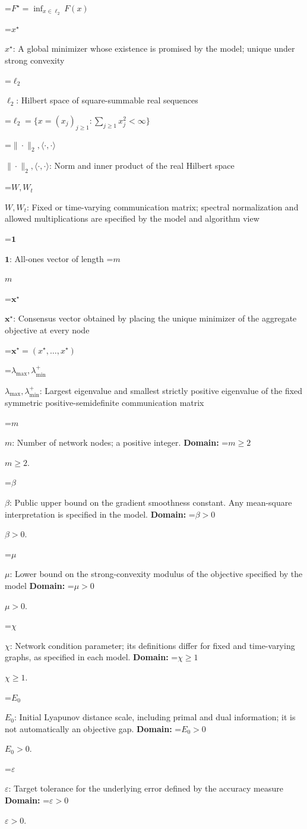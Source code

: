 \documentclass[10pt,a4paper]{article}
\newcommand{\AtlasMath}[1]{\par\begingroup\centering\setbox0=\hbox{$\displaystyle #1$}\ifdim\wd0>1.4\linewidth\typeout{ATLAS WIDE FORMULA: \the\wd0}\fi\ifdim\wd0>\linewidth\resizebox{\linewidth}{!}{\box0}\else\box0\fi\par\endgroup}
\newcommand{\AtlasInlineMath}[1]{\begingroup\setbox0=\hbox{$#1$}\ifdim\wd0>.4\linewidth\endgroup\AtlasMath{#1}\else\endgroup$#1$\fi}
\begin{document}
\AtlasMath{F^\star=\inf_{x\in \ell_2}F(x)}


\AtlasInlineMath{x^\star}: A global minimizer whose existence is promised by the model; unique under strong convexity

\AtlasInlineMath{\ell_2}: Hilbert space of square-summable real sequences


\AtlasMath{\ell_2=\{x=(x_j)_{j\ge1}:\sum_{j\ge1}x_j^2<\infty\}}


\AtlasInlineMath{\|\cdot\|_2,\langle\cdot,\cdot\rangle}: Norm and inner product of the real Hilbert space

\AtlasInlineMath{W,W_t}: Fixed or time-varying communication matrix; spectral normalization and allowed multiplications are specified by the model and algorithm view

\AtlasInlineMath{\mathbf1}: All-ones vector of length \AtlasInlineMath{m}

\AtlasInlineMath{\boldsymbol x^\star}: Consensus vector obtained by placing the unique minimizer of the aggregate objective at every node


\AtlasMath{\boldsymbol x^\star=(x^\star,\ldots,x^\star)}


\AtlasInlineMath{\lambda_{\max},\lambda_{\min}^{+}}: Largest eigenvalue and smallest strictly positive eigenvalue of the fixed symmetric positive-semidefinite communication matrix

\AtlasInlineMath{m}: Number of network nodes; a positive integer. \textbf{Domain:} \AtlasInlineMath{m\ge2}.

\AtlasInlineMath{\beta}: Public upper bound on the gradient smoothness constant. Any mean-square interpretation is specified in the model. \textbf{Domain:} \AtlasInlineMath{\beta>0}.

\AtlasInlineMath{\mu}: Lower bound on the strong-convexity modulus of the objective specified by the model \textbf{Domain:} \AtlasInlineMath{\mu>0}.

\AtlasInlineMath{\chi}: Network condition parameter; its definitions differ for fixed and time-varying graphs, as specified in each model. \textbf{Domain:} \AtlasInlineMath{\chi\ge1}.

\AtlasInlineMath{E_0}: Initial Lyapunov distance scale, including primal and dual information; it is not automatically an objective gap. \textbf{Domain:} \AtlasInlineMath{E_0>0}.

\AtlasInlineMath{\varepsilon}: Target tolerance for the underlying error defined by the accuracy measure \textbf{Domain:} \AtlasInlineMath{\varepsilon>0}.
\end{document}
